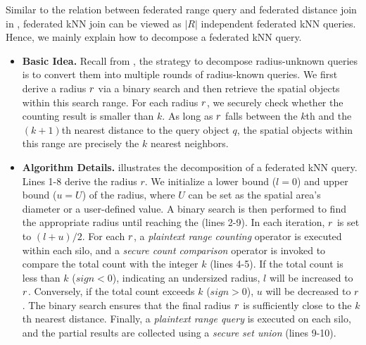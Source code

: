 Similar to the relation between federated range query and federated distance join in , federated kNN join can be viewed as $|R|$ independent federated kNN queries.
Hence, we mainly explain how to decompose a federated kNN query.
\begin{itemize}
    \item \textbf{Basic Idea.}
    Recall from , the strategy to decompose radius-unknown queries is to convert them into multiple rounds of radius-known queries.
    We first derive a radius $r$ via a binary search and then retrieve the spatial objects within this search range.
    For each radius $r$, we securely check whether the counting result is smaller than $k$.
    As long as $r$ falls between the $k$th and the $(k+1)$th nearest distance to the query object $q$, the spatial objects within this range are precisely  the $k$ nearest neighbors.

    \item \textbf{Algorithm Details.}
     illustrates the decomposition of a federated kNN query.
    Lines 1-8 derive the radius $r$.
    We initialize a lower bound ($l=0$) and upper bound ($u=U$) of the radius, where $U$ can be set as the spatial area's diameter or a user-defined value.
    A binary search is then performed to find the appropriate radius until reaching the  (lines 2-9).
    In each iteration, $r$ is set to $(l+u)/2$.
    For each $r$, a \textit{plaintext range counting} operator is executed within each silo, and a \textit{secure count comparison} operator is invoked to compare the total count with the integer $k$ (lines 4-5).
    If the total count is less than $k$ (\ie $sign < 0$), indicating an undersized radius, $l$ will be increased to $r$.
    Conversely, if the total count exceeds $k$ (\ie $sign > 0$), $u$ will be decreased to $r$.
    The binary search ensures that the final radius $r$ is sufficiently close to the $k$th nearest distance.
    Finally, a \textit{plaintext range query} is executed on each silo, and the partial results are collected using a \textit{secure set union} (lines 9-10).
\end{itemize}


